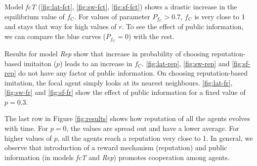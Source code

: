 \documentclass[11pt, A4 paper, twocolumn ]{article}
\newcommand{\fc}{$ f_{\text{C}} $}
\newcommand{\fcm}{f_{\text{C}}}
\begin{document}
	Model \textit{fcT} (\ref{fig:lat-fct}, \ref{fig:sw-fct}, \ref{fig:sf-fct}) shows a drastic increase in the equilibrium value of \fc. For values of parameter $ P_{\fcm} > 0.7$, \fc{} is very close to 1 and stays that way for high values of $ r $. To see the effect of public information, we can compare the blue curves ($ P_{\fcm} = 0$) with the rest.  \par 
	
	Results for model \textit{Rep} show that increase in probability of choosing reputation-based imitaiton ($ p $) leads to an increase in \fc. \ref{fig:lat-rep}, \ref{fig:sw-rep} and \ref{fig:sf-rep} do not have any factor of public information. On choosing reputation-based imitation, the focal agent simply looks at its nearest neighbours. \ref{fig:lat-fr}, \ref{fig:sw-fr} and \ref{fig:sf-fr} show the effect of public information for a fixed value of $ p = 0.3$.\par 
	The last row in Figure \ref{fig:results} shows how reputation of all the agents evolves with time. For $ p = 0 $, the values are spread out and have a lower average. For higher values of $ p $, all the agents reach a reputation very close to 1. 
	In general, we observe that introduction of a reward mechanism (reputation) and public information (in models \textit{fcT }and \textit{Rep}) promotes cooperation among agents.
	
\end{document}
